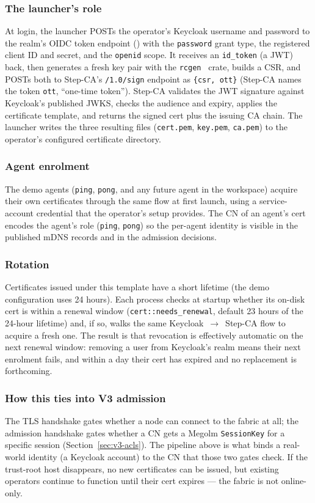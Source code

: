 \documentclass[11pt,a4paper]{article}
\begin{document}
\subsubsection{The launcher's role}
At login, the launcher POSTs the operator's Keycloak username and
password to the realm's OIDC token endpoint
() with the
\texttt{password} grant type, the registered client ID and secret,
and the \texttt{openid} scope. It receives an \texttt{id\_token}
(a JWT) back, then generates a fresh key pair with the
\texttt{rcgen}~\citep{rcgen} crate, builds a CSR, and POSTs both
to Step-CA's \texttt{/1.0/sign} endpoint as
\texttt{\{csr, ott\}} (Step-CA names the token \texttt{ott},
``one-time token''). Step-CA validates the JWT signature against
Keycloak's published JWKS, checks the audience and expiry, applies
the certificate template, and returns the signed cert plus the
issuing CA chain. The launcher writes the three resulting files
(\texttt{cert.pem}, \texttt{key.pem}, \texttt{ca.pem}) to the
operator's configured certificate directory.

\subsubsection{Agent enrolment}
The demo agents (\texttt{ping}, \texttt{pong}, and any future agent
in the workspace) acquire their own certificates through the same
flow at first launch, using a service-account credential that the
operator's setup provides. The CN of an agent's cert encodes the
agent's role (\texttt{ping}, \texttt{pong}) so the per-agent
identity is visible in the published mDNS records and in the
admission decisions.

\subsubsection{Rotation}
Certificates issued under this template have a short lifetime (the
demo configuration uses 24 hours). Each process checks at startup
whether its on-disk cert is within a renewal window
(\texttt{cert::needs\_renewal}, default 23 hours of the 24-hour
lifetime) and, if so, walks the same Keycloak~$\rightarrow$~Step-CA
flow to acquire a fresh one. The result is that revocation is
effectively automatic on the next renewal window: removing a user
from Keycloak's realm means their next enrolment fails, and within
a day their cert has expired and no replacement is forthcoming.

\subsubsection{How this ties into V3 admission}
The TLS handshake gates whether a node can connect to the fabric
at all; the admission handshake gates whether a CN gets a Megolm
\texttt{SessionKey} for a specific session
(Section~\ref{sec:v3-acls}). The pipeline above is what binds a
real-world identity (a Keycloak account) to the CN that those two
gates check. If the trust-root host disappears, no new certificates
can be issued, but existing operators continue to function until
their cert expires --- the fabric is not online-only.
\end{document}
